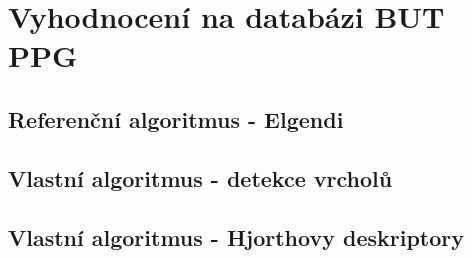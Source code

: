 \section{Vyhodnocení na databázi BUT PPG}
\label{sec:vysledky_butppg}

\subsection*{Referenční algoritmus - Elgendi}

\subsection*{Vlastní algoritmus - detekce vrcholů}

\subsection*{Vlastní algoritmus - Hjorthovy deskriptory}
